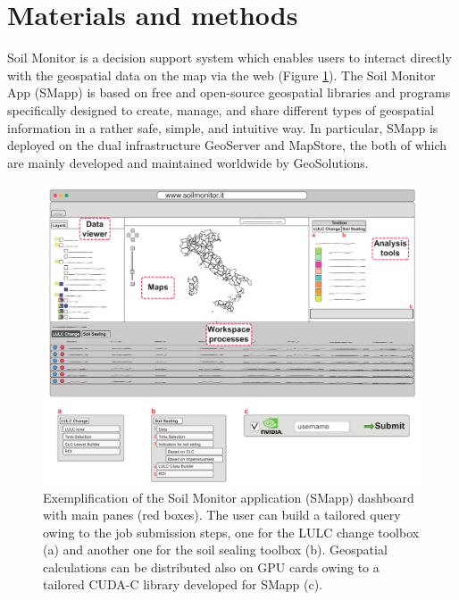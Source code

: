 \documentclass[APA,LATO1COL,doublespace]{WileyNJD-v2}
\begin{document}
\section{Materials and methods}
Soil Monitor is a decision support system which enables users to interact directly with the geospatial data on the map via the web (Figure \ref{fig:SMapp}).
The Soil Monitor App (SMapp) is based on free and open-source geospatial libraries and programs specifically designed to create, manage, and share different types of geospatial information in a rather safe, simple, and intuitive way.
In particular, SMapp is deployed on the dual infrastructure GeoServer and MapStore, the both of which are mainly developed and maintained worldwide by GeoSolutions.

\begin{figure}[t]
    \centerline{\includegraphics[width=500pt]{Figure01.pdf}}
    \caption{Exemplification of the Soil Monitor application (SMapp) dashboard with main panes (red boxes). 
    The user can build a tailored query owing to the job submission steps, one for the LULC change toolbox (a) and another one for the soil sealing toolbox (b). 
    Geospatial calculations can be distributed also on GPU cards owing to a tailored CUDA-C library developed for SMapp (c). } \label{fig:SMapp}
\end{figure}
\end{document}
